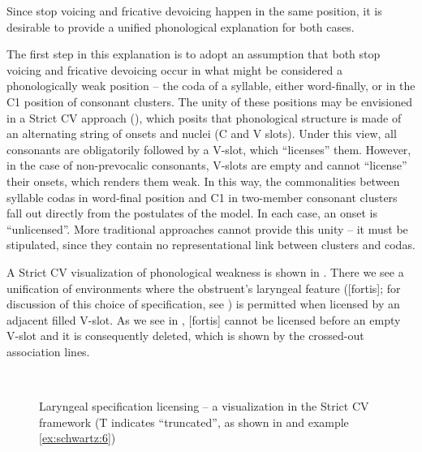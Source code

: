 \documentclass[output=paper]{langscibook}
\begin{document}
Since stop voicing and fricative devoicing happen in the same position, it is desirable to provide a unified phonological explanation for both cases. 

The first step in this explanation is to adopt an assumption that both stop voicing and fricative devoicing occur in what might be considered a phonologically weak position – the coda of a syllable, either word-finally, or in the C1 position of consonant clusters. The unity of these positions may be envisioned in a Strict CV approach (\citealt{SégéralScheer2001,Scheer2004}), which posits that phonological structure is made of an alternating string of onsets and nuclei (C and V slots). Under this view, all consonants are obligatorily followed by a V-slot, which “licenses” them. However, in the case of non-prevocalic consonants, V-slots are empty and cannot “license” their onsets, which renders them weak. In this way, the commonalities between syllable codas in word-final position and C1 in two-member consonant clusters fall out directly from the postulates of the model. In each case, an onset is “unlicensed”. More traditional approaches cannot provide this unity – it must be stipulated, since they contain no representational link between clusters and codas.

A Strict CV visualization of phonological weakness is shown in . There we see a unification of environments where the obstruent’s laryngeal feature ([fortis]; for discussion of this choice of specification, see ) is permitted when licensed by an adjacent filled V-slot. As we see in , [fortis] cannot be licensed before an empty V-slot and it is consequently deleted, which is shown by the crossed-out association lines.


\begin{figure}
\caption{\label{exfig:schwartz:7}Laryngeal specification licensing – a visualization in the Strict CV framework (T indicates “truncated”, as shown in  and example \ref{ex:schwartz:6})}
\hfill
{}
\hfill
{}
\hfill~
\end{figure}
 
\end{document}
